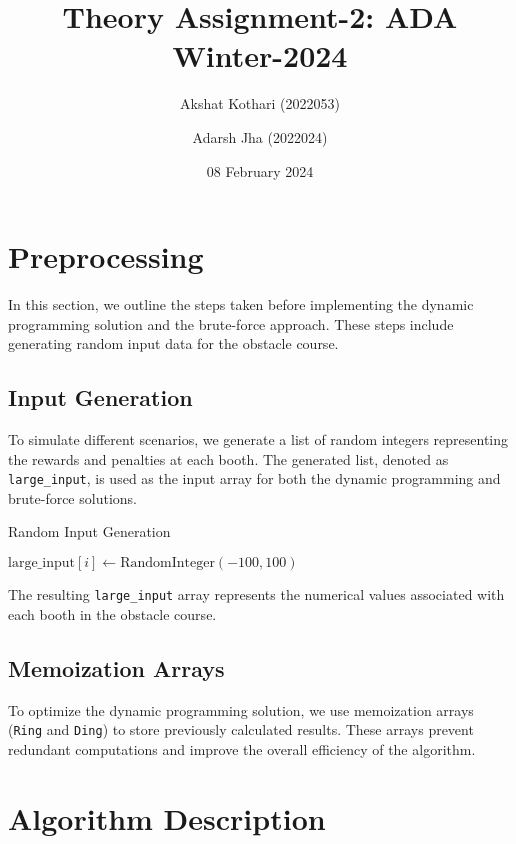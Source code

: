 \documentclass{article}
\title{Theory Assignment-2: ADA Winter-2024}
\author{Akshat Kothari (2022053) \and Adarsh Jha (2022024)}
\date{08 February 2024}
\begin{document}
\maketitle

\section{Preprocessing}

In this section, we outline the steps taken before implementing the dynamic programming solution and the brute-force approach. These steps include generating random input data for the obstacle course.

\subsection{Input Generation}

To simulate different scenarios, we generate a list of random integers representing the rewards and penalties at each booth. The generated list, denoted as \texttt{large\_input}, is used as the input array for both the dynamic programming and brute-force solutions.

\begin{algorithm}
\caption{Random Input Generation}\label{input-generation}
\begin{algorithmic}[1]
    \State $\text{large\_input}[i] \gets \text{RandomInteger}(-100, 100)$ 
\EndFor
\end{algorithmic}
\end{algorithm}

The resulting \texttt{large\_input} array represents the numerical values associated with each booth in the obstacle course.

\subsection{Memoization Arrays}

To optimize the dynamic programming solution, we use memoization arrays (\texttt{Ring} and \texttt{Ding}) to store previously calculated results. These arrays prevent redundant computations and improve the overall efficiency of the algorithm.

\section{Algorithm Description}
\end{document}
